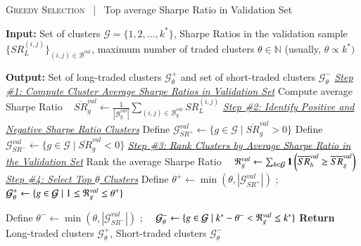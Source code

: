 \begin{algorithm}
\caption{
\textsc{Greedy Selection} 
~|~
{{Top average Sharpe Ratio in Validation Set}}
}
\label{alg:greedy_selection}
\begin{algorithmic}[1]
\mx 
\State \textbf{Input:} Set of clusters $\mathcal{G} = \{1, 2, \ldots, k^*\}$, Sharpe Ratios in the validation sample $\{SR_L^{(i,j)}\}_{(i,j)\in \mathcal B^{val}}$, maximum number of traded clusters $\theta\in\mathbb{N}$ (usually, $\theta\propto k^*)$

\mx 
\State \textbf{Output:} Set of long-traded clusters $\mathcal{G}_{\theta}^{+}$ and set of short-traded clusters $\mathcal{G}_{\theta}^{-}$
\vspace{0.4cm}
\Statex \underline{\textit{Step \#1: Compute Cluster Average Sharpe Ratios in Validation Set}}
    \State Compute average Sharpe Ratio ~
$
\overline{S R}_g^{val} \leftarrow \frac{1}{|\mathcal{B}_g^{val} |} \sum_{(i,j) \in \mathcal{B}_g^{val}} S R_{{{L}}}^{(i,j)}
$
\EndFor
\vspace{0.4cm}
\Statex \underline{\textit{Step \#2: Identify Positive and Negative Sharpe Ratio Clusters}}
\State Define $\mathcal{G}_{SR^+}^{val} \leftarrow \{ g \in \mathcal{G} \mid \overline{SR}_g^{val} > 0 \}$
\State Define $\mathcal{G}_{SR^-}^{val} \leftarrow \{ g \in \mathcal{G} \mid \overline{SR}_g^{val} < 0 \}$
\vspace{0.4cm}
\Statex \underline{\textit{Step \#3: Rank Clusters by Average Sharpe Ratio in the Validation Set}}
	\State Rank the average Sharpe Ratio~~
$
\mathfrak{R}_g^{val} \leftarrow  \sum_{h \in \mathcal{G}} 
\mathbf{1}\left(
\overline{S R}_h^{val} \geq \overline{S R}_g^{val} 
\right)
$
\EndFor
\vspace{0.4cm}
\Statex \underline{\textit{Step \#4: Select Top $\theta$ Clusters}}
\State Define $\theta^+ \leftarrow \min(\theta, |\mathcal{G}_{SR^+}^{val}|)$
;~~
$\mathcal{G}_{\theta}^{+} \leftarrow \{ g\in\mathcal{G} \mid 1 \leq \mathfrak{R}_g^{val} \leq \theta^+ \}$

\State Define $\theta^- \leftarrow \min(\theta, |\mathcal{G}_{SR^-}^{val}|)$
;~~
 $\mathcal{G}_{\theta}^{-} \leftarrow \{ g \in\mathcal{G} \mid k^* - \theta^- < \mathfrak{R}_g^{val} \leq k^* \}$
\vspace{0.5cm}
\State \textbf{Return} Long-traded clusters $\mathcal{G}_{\theta}^{+}$, Short-traded clusters $\mathcal{G}_{\theta}^{-}$

\end{algorithmic}
\end{algorithm}

